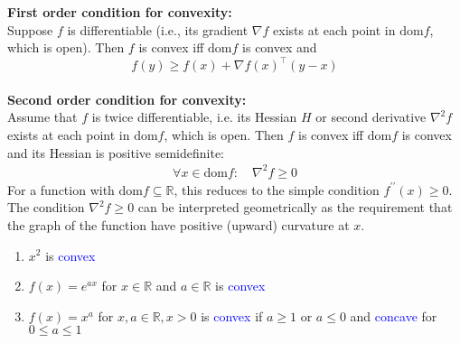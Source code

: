 \begin{solution}[print=true]

\textbf{First order condition for convexity:}\\
Suppose $f$ is differentiable (i.e., its gradient $\nabla f$ exists at each point in $\mathrm{dom} f$,
which is open). Then $f$ is convex iff $\mathrm{dom} f$ is convex and
\begin{equation}
f(y) \geq f(x) + \nabla f(x)^\top (y-x)
\end{equation}
\\
\textbf{Second order condition for convexity:}\\
Assume that $f$ is twice differentiable, i.e. its Hessian $H$ or second derivative $\nabla^2 f$ exists at each point in $\mathrm{dom}f$, which is open. Then $f$ is convex iff $\mathrm{dom}f$ is convex and its Hessian is positive semidefinite:
\begin{align*}
\forall x\in \mathrm{dom} f: \quad\nabla^2 f \geq 0
\end{align*}
For a function with $\mathrm{dom}f \subseteq\mathbb{R}$, this reduces to the simple condition $f^{\prime\prime}(x) \geq 0$. The condition $\nabla^2 f \geq 0$ can be interpreted geometrically as the requirement that the
graph of the function have positive (upward) curvature at $x$.
  \begin{enumerate}[label=\emph{\alph*)}]
  \item $x^2$ is \textcolor{blue}{convex}
\item $f(x) = e^{ax}$ for $x\in \mathbb{R}$ and $a \in \mathbb{R}$ is \textcolor{blue}{convex}
\item $f(x) = x^a$ for $x, a\in \mathbb{R}, x> 0$ is \textcolor{blue}{convex} if $a\geq 1$ or $a\leq 0$ and \textcolor{blue}{concave} for $0 \leq a \leq 1$

\end{enumerate}
\end{solution}
